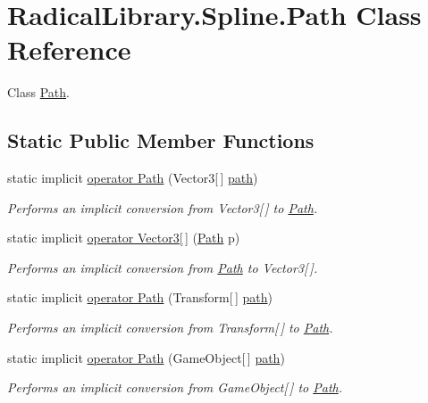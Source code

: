 \hypertarget{class_radical_library_1_1_spline_1_1_path}{}\section{Radical\+Library.\+Spline.\+Path Class Reference}
\label{class_radical_library_1_1_spline_1_1_path}


Class \hyperlink{class_radical_library_1_1_spline_1_1_path}{Path}.  


\subsection*{Static Public Member Functions}
\begin{DoxyCompactItemize}
\item 
static implicit \hyperlink{class_radical_library_1_1_spline_1_1_path_a3cb523b249610fcb64f4a3387b881304}{operator Path} (Vector3\mbox{[}$\,$\mbox{]} \hyperlink{class_radical_library_1_1_spline_1_1_path_a30b8ec768fb58165f56d040384cc1e0e}{path})
\begin{DoxyCompactList}\small\item\em Performs an implicit conversion from Vector3\mbox{[}$\,$\mbox{]} to \hyperlink{class_radical_library_1_1_spline_1_1_path}{Path}. \end{DoxyCompactList}\item 
static implicit \hyperlink{class_radical_library_1_1_spline_1_1_path_aee769e4853c6917039d1fd15035a4538}{operator Vector3\mbox{[}$\,$\mbox{]}} (\hyperlink{class_radical_library_1_1_spline_1_1_path}{Path} p)
\begin{DoxyCompactList}\small\item\em Performs an implicit conversion from \hyperlink{class_radical_library_1_1_spline_1_1_path}{Path} to Vector3\mbox{[}$\,$\mbox{]}. \end{DoxyCompactList}\item 
static implicit \hyperlink{class_radical_library_1_1_spline_1_1_path_afd16f8d283f669e98a918e49b6a57b06}{operator Path} (Transform\mbox{[}$\,$\mbox{]} \hyperlink{class_radical_library_1_1_spline_1_1_path_a30b8ec768fb58165f56d040384cc1e0e}{path})
\begin{DoxyCompactList}\small\item\em Performs an implicit conversion from Transform\mbox{[}$\,$\mbox{]} to \hyperlink{class_radical_library_1_1_spline_1_1_path}{Path}. \end{DoxyCompactList}\item 
static implicit \hyperlink{class_radical_library_1_1_spline_1_1_path_a426968ba542f38021b57a469d6980d34}{operator Path} (Game\+Object\mbox{[}$\,$\mbox{]} \hyperlink{class_radical_library_1_1_spline_1_1_path_a30b8ec768fb58165f56d040384cc1e0e}{path})
\begin{DoxyCompactList}\small\item\em Performs an implicit conversion from Game\+Object\mbox{[}$\,$\mbox{]} to \hyperlink{class_radical_library_1_1_spline_1_1_path}{Path}. \end{DoxyCompactList}\end{DoxyCompactItemize}
